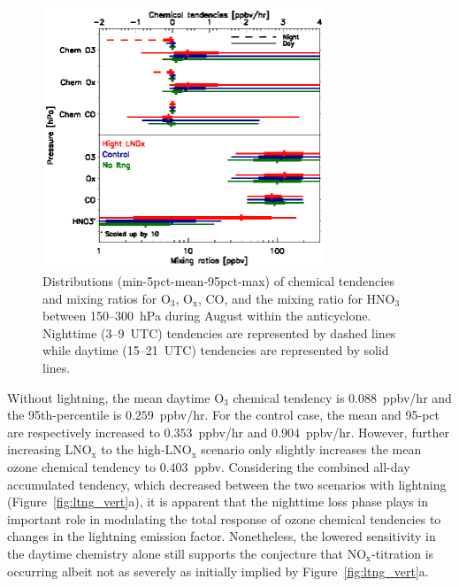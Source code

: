  \begin{figure}
 \noindent\includegraphics[width=20pc]{figures/ltngsens_diurnal.eps}
 \caption{Distributions (min-5pct-mean-95pct-max) of chemical tendencies
and mixing ratios for O$_3$, O$_{\mathrm{x}}$, CO, and the mixing ratio
for HNO$_3$ between 150--300~hPa during August within the
anticyclone. Nighttime (3--9~UTC) tendencies are represented by dashed
lines while daytime (15--21~UTC) tendencies are represented by solid
lines.}
 \label{fig:ltng_di}
 \end{figure}

Without lightning, the mean daytime O$_3$ chemical tendency is $0.088$~ppbv/hr and the
95th-percentile is $0.259$~ppbv/hr. For the control case, the mean
and 95-pct are respectively increased to $0.353$~ppbv/hr and $0.904$~ppbv/hr.
However, further increasing LNO$_\mathrm{x}$ to the high-LNO$_\mathrm{x}$
scenario only slightly increases the mean ozone chemical tendency to $0.403$~ppbv.
Considering the combined all-day accumulated tendency, which decreased
between the two scenarios with lightning (Figure~\ref{fig:ltng_vert}a), it is apparent
that the nighttime loss phase plays in important role in modulating the total
response of ozone chemical tendencies to changes in the lightning emission factor.
Nonetheless, the lowered sensitivity in the daytime chemistry alone still supports
the conjecture that NO$_\mathrm{x}$-titration is occurring albeit not as severely
as initially implied by Figure~\ref{fig:ltng_vert}a.

